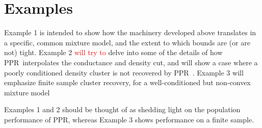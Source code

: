 \documentclass{article}
\newcommand{\1}{\mathbf{1}}
\newcommand{\ppr}{{\sc PPR}}
\newcommand{\pprspace}{{\sc PPR~}}
\theoremstyle{aldenthm}
\theoremstyle{aldenrmrk}
\begin{document}
\section{Examples}
\label{section: examples}

Example 1 is intended to show how the machinery developed above translates in a specific, common mixture model, and the extent to which bounds are (or are not) tight.  Example 2 \textcolor{red}{will try to} delve into some of the details of how \pprspace interpolates the conductance and density cut, and will show a case where a poorly conditioned density cluster is not recovered by \pprspace. Example 3 will emphasize finite sample cluster recovery, for a well-conditioned but non-convex mixture model

Examples 1 and 2 should be thought of as shedding light on the population performance of \ppr, whereas Example 3 shows performance on a finite sample.
\end{document}
